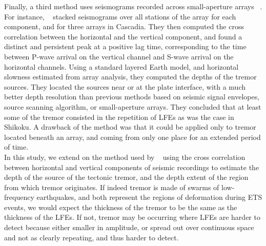 \documentclass[draft]{agujournal2019}
\begin{document}
Finally, a third method uses seismograms recorded across small-aperture arrays ~\cite{GHO_2010_GRL, LAR_2009}. For instance, ~ stacked seismograms over all stations of the array for each component, and for three arrays in Cascadia. They then computed the cross correlation between the horizontal and the vertical component, and found a distinct and persistent peak at a positive lag time, corresponding to the time between P-wave arrival on the vertical channel and S-wave arrival on the horizontal channels. Using a standard layered Earth model, and horizontal slowness estimated from array analysis, they computed the depths of the tremor sources. They located the sources near or at the plate interface, with a much better depth resolution than previous methods based on seismic signal envelopes, source scanning algorithm, or small-aperture arrays. They concluded that at least some of the tremor consisted in the repetition of LFEs as was the case in Shikoku. A drawback of the method was that it could be applied only to tremor located beneath an array, and coming from only one place for an extended period of time. \\

In this study, we extend on the method used by ~ using the cross correlation between horizontal and vertical components of seismic recordings to estimate the depth of the source of the tectonic tremor, and the depth extent of the region from which tremor originates. If indeed tremor is made of swarms of low-frequency earthquakes, and both represent the regions of deformation during ETS events, we would expect the thickness of the tremor to be the same as the thickness of the LFEs. If not, tremor may be occurring where LFEs are harder to detect because either smaller in amplitude, or spread out over continuous space and not as clearly repeating, and thus harder to detect.
\end{document}
